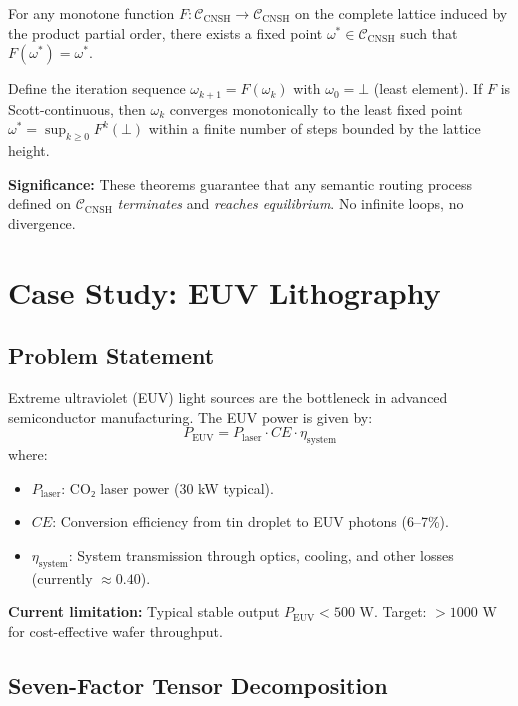 \documentclass[twocolumn]{article}
\begin{document}
\begin{theorem}
\label{thm:kt}
For any monotone function $F: \mathcal{C}_{\text{CNSH}} \to \mathcal{C}_{\text{CNSH}}$ on the complete lattice induced by the product partial order, there exists a fixed point $\omega^* \in \mathcal{C}_{\text{CNSH}}$ such that $F(\omega^*) = \omega^*$.
\end{theorem}

\begin{theorem}
\label{thm:kleene}
Define the iteration sequence $\omega_{k+1} = F(\omega_k)$ with $\omega_0 = \bot$ (least element). If $F$ is Scott-continuous, then $\omega_k$ converges monotonically to the least fixed point $\omega^* = \sup_{k \geq 0} F^k(\bot)$ within a finite number of steps bounded by the lattice height.
\end{theorem}

\textbf{Significance:} These theorems guarantee that any semantic routing process defined on $\mathcal{C}_{\text{CNSH}}$ \emph{terminates} and \emph{reaches equilibrium}. No infinite loops, no divergence.

\section{Case Study: EUV Lithography}

\subsection{Problem Statement}

Extreme ultraviolet (EUV) light sources are the bottleneck in advanced semiconductor manufacturing. The EUV power is given by:
\[
P_{\text{EUV}} = P_{\text{laser}} \cdot CE \cdot \eta_{\text{system}}
\]
where:
\begin{itemize}
  \item $P_{\text{laser}}$: CO₂ laser power (30 kW typical).
  \item $CE$: Conversion efficiency from tin droplet to EUV photons (6–7\%).
  \item $\eta_{\text{system}}$: System transmission through optics, cooling, and other losses (currently $\approx 0.40$).
\end{itemize}

\textbf{Current limitation:} Typical stable output $P_{\text{EUV}} < 500\text{ W}$. Target: $> 1000\text{ W}$ for cost-effective wafer throughput.

\subsection{Seven-Factor Tensor Decomposition}
\end{document}
